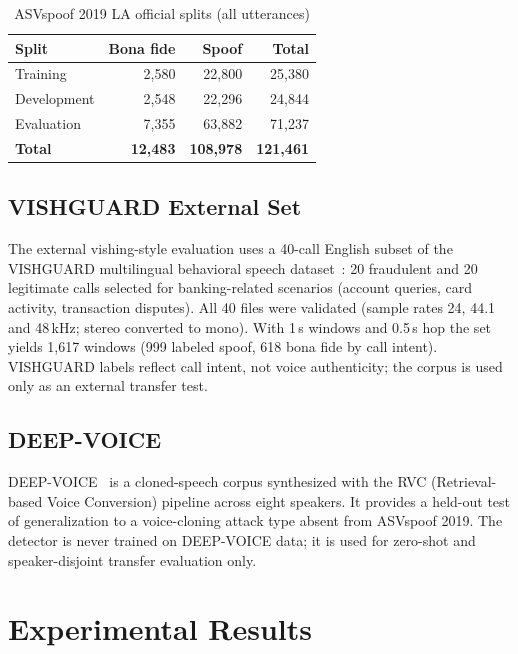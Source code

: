 \documentclass[conference]{IEEEtran}
\begin{document}
\begin{table}[htbp]
\caption{ASVspoof 2019 LA official splits (all utterances)}
\begin{center}
\begin{tabular}{lrrr}
\toprule
\textbf{Split} & \textbf{Bona fide} & \textbf{Spoof} & \textbf{Total}\\
\midrule
Training     & 2,580  & 22,800  & 25,380\\
Development  & 2,548  & 22,296  & 24,844\\
Evaluation   & 7,355  & 63,882  & 71,237\\
\midrule
\textbf{Total} & \textbf{12,483} & \textbf{108,978} & \textbf{121,461}\\
\bottomrule
\end{tabular}
\label{tab:asv}
\end{center}
\end{table}

\subsection{VISHGUARD External Set}

The external vishing-style evaluation uses a 40-call English subset of the VISHGUARD multilingual behavioral speech dataset~\cite{vishguard}: 20 fraudulent and 20 legitimate calls selected for banking-related scenarios (account queries, card activity, transaction disputes). All 40 files were validated (sample rates 24, 44.1 and 48\,kHz; stereo converted to mono). With 1\,s windows and 0.5\,s hop the set yields 1,617 windows (999 labeled spoof, 618 bona fide by call intent). VISHGUARD labels reflect call intent, not voice authenticity; the corpus is used only as an external transfer test.

\subsection{DEEP-VOICE}

DEEP-VOICE~\cite{deepvoice} is a cloned-speech corpus synthesized with the RVC (Retrieval-based Voice Conversion) pipeline across eight speakers. It provides a held-out test of generalization to a voice-cloning attack type absent from ASVspoof 2019. The detector is never trained on DEEP-VOICE data; it is used for zero-shot and speaker-disjoint transfer evaluation only.

\section{Experimental Results}
\end{document}
